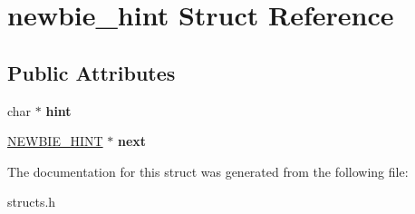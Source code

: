\hypertarget{structnewbie__hint}{\section{newbie\-\_\-hint Struct Reference}
\label{structnewbie__hint}
}
\subsection*{Public Attributes}
\begin{DoxyCompactItemize}
\item 
\hypertarget{structnewbie__hint_a1712565669c79b17ea165ed6225299a0}{char $\ast$ {\bfseries hint}}\label{structnewbie__hint_a1712565669c79b17ea165ed6225299a0}

\item 
\hypertarget{structnewbie__hint_ae8ca1bd6c396aa1d3614fde9d8043945}{\hyperlink{structnewbie__hint}{N\-E\-W\-B\-I\-E\-\_\-\-H\-I\-N\-T} $\ast$ {\bfseries next}}\label{structnewbie__hint_ae8ca1bd6c396aa1d3614fde9d8043945}

\end{DoxyCompactItemize}


The documentation for this struct was generated from the following file\-:\begin{DoxyCompactItemize}
\item 
structs.\-h\end{DoxyCompactItemize}
